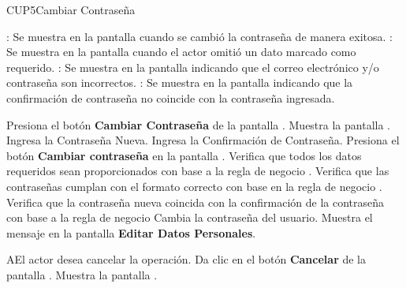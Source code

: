 \begin{UseCase}{CUP5}{Cambiar Contraseña}
{\begin{UClist}
	    \UCli {}: Se muestra en la pantalla  cuando se cambió la contraseña de manera exitosa.
	    \UCli {}: Se muestra en la pantalla  cuando el actor omitió un dato marcado como requerido.
		\UCli {}: Se muestra en la pantalla  indicando que el correo electrónico y/o contraseña son incorrectos.
		\UCli {}: Se muestra en la pantalla  indicando que la confirmación de contraseña no coincide con la contraseña ingresada.
		
	    \end{UClist}
	}
 \end{UseCase}

 \begin{UCtrayectoria}
 	
 	\UCpaso [\UCactor] Presiona el botón \textbf{Cambiar Contraseña} de la pantalla .
 	\UCpaso Muestra la pantalla .
 	\UCpaso [\UCactor] Ingresa la Contraseña Nueva.
 	\UCpaso [\UCactor]Ingresa la Confirmación de Contraseña.
 	\UCpaso [\UCactor] Presiona el botón \textbf{Cambiar contraseña} en la pantalla  .
 	\UCpaso Verifica que todos los datos requeridos sean proporcionados con base a la regla de negocio .
 	\UCpaso Verifica que las contraseñas cumplan con el formato correcto con base en la regla de negocio .
 	\UCpaso Verifica que la contraseña nueva coincida con la confirmación de la contraseña con base a la regla de negocio 
 	\UCpaso Cambia la contraseña del usuario.
 	\UCpaso Muestra el mensaje  en la pantalla \textbf{Editar Datos Personales}.
     
 \end{UCtrayectoria}

 \begin{UCtrayectoriaA}{A}{El actor desea cancelar la operación.}
 	\UCpaso [\UCactor] Da clic en el botón \textbf{Cancelar} de la pantalla .
 	\UCpaso Muestra la pantalla .
    
 \end{UCtrayectoriaA}

